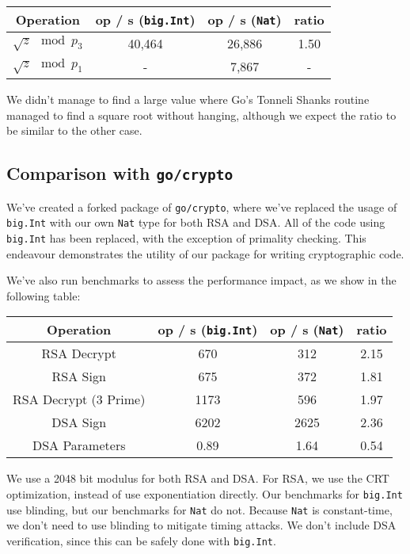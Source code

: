 \documentclass[11pt, a4paper]{article} %
\begin{document}
{\begin{center}
 \begin{tabular}{|c | c | c | c|} 
 \hline
 Operation & op / s (\texttt{big.Int}) & op / s (\texttt{Nat}) & ratio \\ [0.5ex] 
 \hline\hline
 $\sqrt{z} \mod p_3$ & 40,464 & 26,886 & 1.50 \\
 \hline
 $\sqrt{z} \mod p_1$ & - & 7,867 & - \\
 \hline
\end{tabular}
\end{center}

We didn't manage to find a large value where Go's Tonneli Shanks routine
managed to find a square root without hanging, although we
expect the ratio to be similar to the other case.

\subsection{Comparison with \texttt{go/crypto}}

We've created a forked package
\cite{meier_cronokirbyctcrypto_2021}
of \texttt{go/crypto}, where we've replaced the usage of \texttt{big.Int}
with our own \texttt{Nat} type for both RSA and DSA. All of the code
using \texttt{big.Int} has been replaced, with the exception of
primality checking. This endeavour demonstrates the utility of
our package for writing cryptographic code.

We've also run benchmarks to assess the performance impact, as we
show in the following table:

\begin{center}
 \begin{tabular}{|c | c | c | c|} 
 \hline
 Operation & op / s (\texttt{big.Int}) & op / s (\texttt{Nat}) & ratio \\ [0.5ex] 
 \hline\hline
 RSA Decrypt & 670 & 312 & 2.15 \\
 \hline
 RSA Sign & 675 & 372 & 1.81 \\
 \hline
 RSA Decrypt (3 Prime) & 1173 & 596 & 1.97 \\
 \hline
 DSA Sign & 6202 & 2625 & 2.36 \\
 \hline
 DSA Parameters & 0.89 & 1.64 & 0.54 \\
 \hline
\end{tabular}
\end{center}

We use a 2048 bit modulus for both RSA and DSA. For RSA, we use
the CRT optimization, instead of use exponentiation directly.
Our benchmarks for \texttt{big.Int} use blinding, but our benchmarks
for \texttt{Nat} do not. Because \texttt{Nat} is constant-time,
we don't need to use blinding to mitigate timing attacks.
We don't include DSA verification, since this can be safely done
with \texttt{big.Int}.

}
\end{document}
